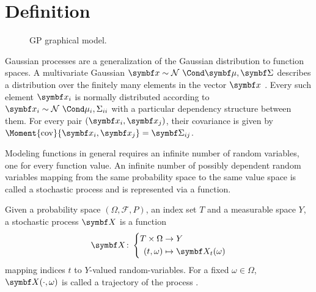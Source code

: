 \section{Definition}
\begin{figure}[t]
    \centering
    \caption{
        GP graphical model.
        \label{fig:gp:graphical_model}
    }
\end{figure}
Gaussian processes are a generalization of the Gaussian distribution to function spaces.
A multivariate Gaussian $\mat{x} \sim \Gaussian{\mat{\mu}, \mat{\Sigma}}$ describes a distribution over the finitely many elements in the vector $\mat{x}$ \cite{gauss_theoria_1809}.
Every such element $\rv{x_i}$ is normally distributed according to $\rv{x_i} \sim \Gaussian{\mu_i, \Sigma_{ii}}$ with a particular dependency structure between them.
For every pair $(\rv{x_i}, \rv{x_j})$, their covariance is given by $\Moment{\cov}{\rv{x_i}, \rv{x_j}} = \mat{\Sigma}_{ij}$.

Modeling functions in general requires an infinite number of random variables, one for every function value.
An infinite number of possibly dependent random variables mapping from the same probability space to the same value space is called a stochastic process and is represented via a function.

\begin{definition}
    \label{def:gp:stochastic_process}
    Given a probability space $(\Omega, \mathcal{F}, P)$, an index set $T$ and a measurable space $Y$, a stochastic process $\rv{X}$ is a function
    \begin{align}
        \rv{X} \colon \left\{\begin{aligned}
            T \times \Omega & \to Y                    \\
            (t, \omega)     & \mapsto \rv{X_t}(\omega)
        \end{aligned}\right.
    \end{align}
    mapping indices $t$ to $Y$-valued random-variables.
    For a fixed $\omega \in \Omega$, $\rv{X}(\cdot, \omega)$ is called a trajectory of the process \cite{astrom_introduction_1971}.
\end{definition}

